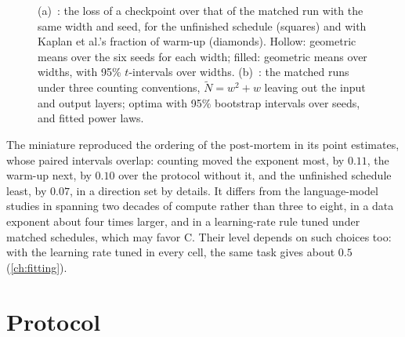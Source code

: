 \begin{refsection}
\begin{figure}[t]
\begin{fullwidth}
\caption{(a)~: the loss of a checkpoint over that of the matched run with the same width and seed, for the unfinished schedule (squares) and with Kaplan et al.'s fraction of warm-up (diamonds). Hollow: geometric means over the six seeds for each width; filled: geometric means over widths, with 95\% $t$-intervals over widths. (b)~: the matched runs under three counting conventions, $\tilde N=w^2+w$ leaving out the input and output layers; optima with 95\% bootstrap intervals over seeds, and fitted power laws.}
\label{fig:protocol:penalty}
\end{fullwidth}
\end{figure}

The miniature reproduced the ordering of the post-mortem in its point estimates, whose paired intervals overlap: counting moved the exponent most, by $0.11$, the warm-up next, by $0.10$ over the protocol without it, and the unfinished schedule least, by $0.07$, in a direction set by details. It differs from the language-model studies in spanning two decades of compute rather than three to eight, in a data exponent about four times larger, and in a learning-rate rule tuned under matched schedules, which may favor C. Their level depends on such choices too: with the learning rate tuned in every cell, the same task gives about $0.5$ (\cref{ch:fitting}).

\section{Protocol}\label{sec:protocol:protocol}


\end{refsection}
